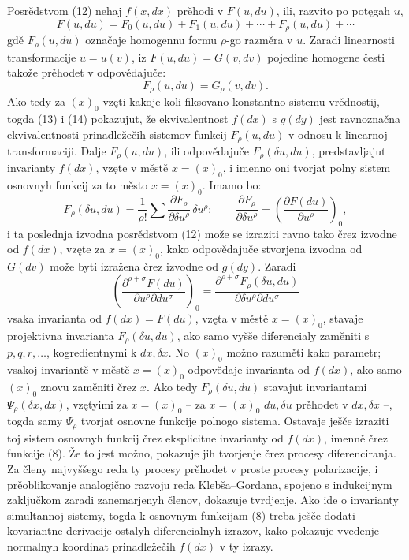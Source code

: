 \documentclass[11pt]{article}
\begin{document}
Posrědstvom (12) nehaj \(f(x,dx)\) prěhodi v \(F(u,du)\), ili, razvito po potęgah \(u\),
\begin{equation}
F(u,du)=F_0(u,du)+F_1(u,du)+\cdots+F_\rho(u,du)+\cdots
\tag{13}
\end{equation}
gdě \(F_\rho(u,du)\) označaje homogennu formu \(\rho\)-go razměra v \(u\). Zaradi linearnosti transformacije \(u=u(v)\), iz \(F(u,du)=G(v,dv)\) pojedine homogene česti takože prěhodet v odpovědajuče:
\begin{equation}
F_\rho(u,du)=G_\rho(v,dv).
\tag{14}
\end{equation}
Ako tedy za \((x)_0\) vzęti kakoje-koli fiksovano konstantno sistemu vrědnostij, togda (13) i (14) pokazujut, že ekvivalentnost \(f(dx)\) s \(g(dy)\) jest ravnoznačna ekvivalentnosti prinadležečih sistemov funkcij \(F_\rho(u,du)\) v odnosu k linearnoj transformaciji. Dalje \(F_\rho(u,du)\), ili odpovědajuče \(F_\rho(\delta u,du)\), predstavljajut invarianty \(f(dx)\), vzęte v městě \(x=(x)_0\), i imenno oni tvorjat polny sistem osnovnyh funkcij za to město \(x=(x)_0\). Imamo bo:
\[
F_\rho(\delta u,du)=\frac1{\rho!}\sum
\frac{\partial F_\rho}{\partial \delta u^\rho}\,\delta u^\rho;
\qquad
\frac{\partial F_\rho}{\partial \delta u^\rho}
=\left(\frac{\partial F(du)}{\partial u^\rho}\right)_0,
\]
i ta poslednja izvodna posrědstvom (12) može se izraziti ravno tako črez izvodne od \(f(dx)\), vzęte za \(x=(x)_0\), kako odpovědajuče stvorjena izvodna od \(G(dv)\) može byti izražena črez izvodne od \(g(dy)\). Zaradi
\[
\left(\frac{\partial^{\rho+\sigma}F(du)}
{\partial u^\rho\partial du^\sigma}\right)_0
=
\frac{\partial^{\rho+\sigma}F_\rho(\delta u,du)}
{\partial\delta u^\rho\partial du^\sigma}
\]
vsaka invarianta od \(f(dx)=F(du)\), vzęta v městě \(x=(x)_0\), stavaje projektivna invarianta \(F_\rho(\delta u,du)\), ako samo vyšše diferencialy zaměniti s \(p,q,r,\ldots\), kogredientnymi k \(dx,\delta x\). No \((x)_0\) možno razuměti kako parametr; vsakoj invariantě v městě \(x=(x)_0\) odpovědaje invarianta od \(f(dx)\), ako samo \((x)_0\) znovu zaměniti črez \(x\). Ako tedy \(F_\rho(\delta u,du)\) stavajut invariantami \(\Psi_\rho(\delta x,dx)\), vzętyimi za \(x=(x)_0\) -- za \(x=(x)_0\) \(du,\delta u\) prěhodet v \(dx,\delta x\) --, togda samy \(\Psi_\rho\) tvorjat osnovne funkcije polnogo sistema. Ostavaje ješče izraziti toj sistem osnovnyh funkcij črez eksplicitne invarianty od \(f(dx)\), imenně črez funkcije (8). Že to jest možno, pokazuje jih tvorjenje črez procesy diferenciranja. Za členy najvyššego reda ty procesy prěhodet v proste procesy polarizacije, i prěoblikovanje analogično razvoju reda Klebša--Gordana, spojeno s indukcijnym zaključkom zaradi zanemarjenyh členov, dokazuje tvrdjenje. Ako ide o invarianty simultannoj sistemy, togda k osnovnym funkcijam (8) treba ješče dodati kovariantne derivacije ostalyh diferencialnyh izrazov, kako pokazuje vvedenje normalnyh koordinat prinadležečih \(f(dx)\) v ty izrazy.
\end{document}
